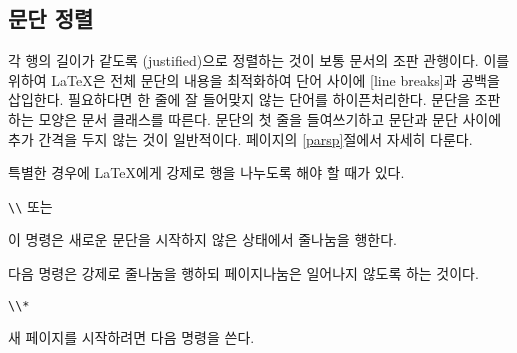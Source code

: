 \subsection{문단 정렬}

각 행의 길이가 같도록 (justified)으로 정렬하는 것이 보통 문서의 조판 관행이다.
이를 위하여 \LaTeX 은 전체 문단의 내용을 최적화하여 단어 사이에 [line breaks]과 
공백을 삽입한다. 필요하다면 한 줄에 잘 들어맞지 않는 단어를 하이픈처리한다.
문단을 조판하는 모양은 문서 클래스를 따른다. 
문단의 첫 줄을 들여쓰기하고 문단과 문단 사이에 추가 간격을 두지 않는 것이 일반적이다.
\pageref{parsp}페이지의 \ref{parsp}절에서 자세히 다룬다.

특별한 경우에 \LaTeX 에게 강제로 행을 나누도록 해야 할 때가 있다.
\begin{lscommand}
\verb|\\| 또는 
\end{lscommand}
\noindent 이 명령은 새로운 문단을 시작하지 않은 상태에서 줄나눔을 행한다.

다음 명령은 강제로 줄나눔을 행하되 페이지나눔은 일어나지 않도록 하는 것이다.
\begin{lscommand}
\verb|\\*|
\end{lscommand}

새 페이지를 시작하려면 다음 명령을 쓴다.
\begin{lscommand}
\end{lscommand}

